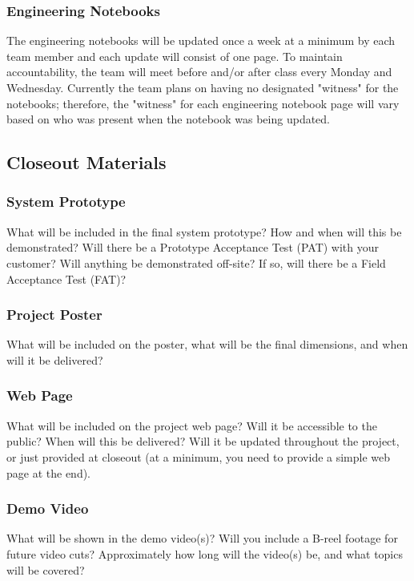 \subsubsection{Engineering Notebooks}
The engineering notebooks will be updated once a week at a minimum by each team member and each update will consist of one page. To maintain accountability, the team will meet before and/or after class every Monday and Wednesday. Currently the team plans on having no designated "witness" for the notebooks; therefore, the "witness" for each engineering notebook page will vary based on who was present when the notebook was being updated.

\subsection{Closeout Materials}

\subsubsection{System Prototype}
What will be included in the final system prototype? How and when will this be demonstrated? Will there be a Prototype Acceptance Test (PAT) with your customer? Will anything be demonstrated off-site? If so, will there be a Field Acceptance Test (FAT)?

\subsubsection{Project Poster}
What will be included on the poster, what will be the final dimensions, and when will it be delivered?

\subsubsection{Web Page}
What will be included on the project web page? Will it be accessible to the public? When will this be delivered? Will it be updated throughout the project, or just provided at closeout (at a minimum, you need to provide a simple web page at the end).

\subsubsection{Demo Video}
What will be shown in the demo video(s)? Will you include a B-reel footage for future video cuts? Approximately how long will the video(s) be, and what topics will be covered?


